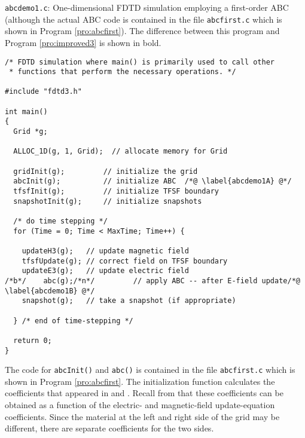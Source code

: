 \begin{program}
{\tt abcdemo1.c}: One-dimensional FDTD simulation employing a
first-order ABC (although the actual ABC code is contained in the
file {\tt abcfirst.c} which is shown in Program \ref{pro:abcfirst}).
The difference between this program and Program \ref{pro:improved3}
is shown in bold.
\label{pro:abcdemo1}
\codemiddle
\begin{lstlisting}
/* FDTD simulation where main() is primarily used to call other
 * functions that perform the necessary operations. */

#include "fdtd3.h"

int main()
{
  Grid *g;

  ALLOC_1D(g, 1, Grid);  // allocate memory for Grid

  gridInit(g);         // initialize the grid
  abcInit(g);          // initialize ABC  /*@ \label{abcdemo1A} @*/
  tfsfInit(g);         // initialize TFSF boundary
  snapshotInit(g);     // initialize snapshots

  /* do time stepping */
  for (Time = 0; Time < MaxTime; Time++) {

    updateH3(g);   // update magnetic field
    tfsfUpdate(g); // correct field on TFSF boundary
    updateE3(g);   // update electric field
/*b*/    abc(g);/*n*/         // apply ABC -- after E-field update/*@ \label{abcdemo1B} @*/
    snapshot(g);   // take a snapshot (if appropriate)

  } /* end of time-stepping */

  return 0;
}
\end{lstlisting}
\end{program}

The code for {\tt abcInit()} and {\tt abc()} is contained in the file
{\tt abcfirst.c} which is shown in Program \ref{pro:abcfirst}.  The
initialization function calculates the coefficients that appeared in
 and .  Recall from
 that these coefficients can be obtained as
a function of the electric- and magnetic-field update-equation
coefficients.  Since the material at the left and right side of the
grid may be different, there are separate coefficients for the two
sides.

